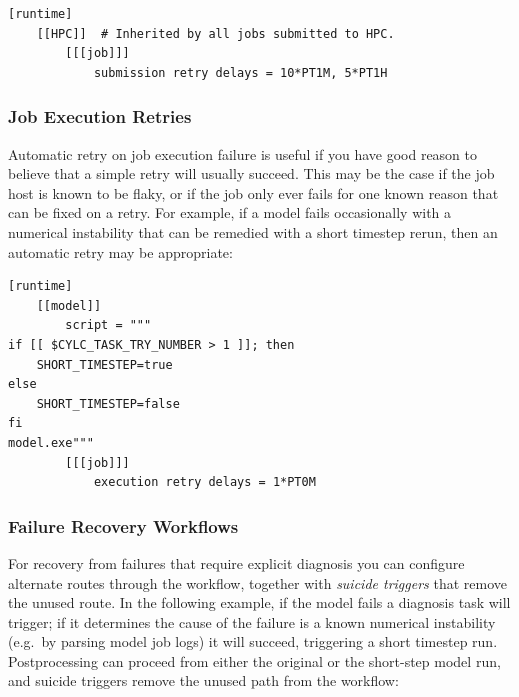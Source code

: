 \lstset{language=suiterc}
\begin{lstlisting}
[runtime]
    [[HPC]]  # Inherited by all jobs submitted to HPC.
        [[[job]]]
            submission retry delays = 10*PT1M, 5*PT1H
\end{lstlisting}

\subsubsection{Job Execution Retries}

Automatic retry on job execution failure is useful if you have good reason to
believe that a simple retry will usually succeed. This may be the case if the
job host is known to be flaky, or if the job only ever fails for one known
reason that can be fixed on a retry. For example, if a model fails occasionally
with a numerical instability that can be remedied with a short timestep rerun,
then an automatic retry may be appropriate:

\lstset{language=suiterc}
\begin{lstlisting}
[runtime]
    [[model]]
        script = """
if [[ $CYLC_TASK_TRY_NUMBER > 1 ]]; then
    SHORT_TIMESTEP=true
else
    SHORT_TIMESTEP=false
fi
model.exe"""
        [[[job]]]
            execution retry delays = 1*PT0M
\end{lstlisting}

\subsubsection{Failure Recovery Workflows}

For recovery from failures that require explicit diagnosis you can configure
alternate routes through the workflow, together with {\em suicide triggers}
that remove the unused route. In the following example, if the model fails a
diagnosis task will trigger; if it determines the cause of the failure is a
known numerical instability (e.g.\ by parsing model job logs) it will succeed,
triggering a short timestep run. Postprocessing can proceed from either the
original or the short-step model run, and suicide triggers remove the unused
path from the workflow:

